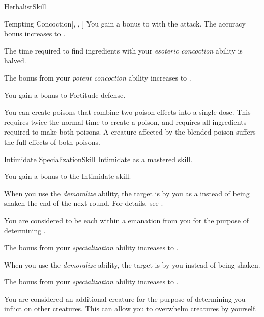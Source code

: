 \begin{feat}{Herbalist}{Skill}
\begin{attuneability}{Tempting Concoction}[, , ]
            \rankline
             You gain a  bonus to  with the attack.
             The accuracy bonus increases to .
        \end{attuneability}

         The time required to find ingredients with your \textit{esoteric concoction} ability is halved.

         The bonus from your \textit{potent concoction} ability increases to .

         You gain a  bonus to Fortitude defense.

         You can create poisons that combine two poison effects into a single dose.
        This requires twice the normal time to create a poison, and requires all ingredients required to make both poisons.
        A creature affected by the blended poison suffers the full effects of both poisons.
    \end{feat}

    \begin{feat}{Intimidate Specialization}{Skill}
        \featpre Intimidate as a mastered skill.

         You gain a  bonus to the Intimidate skill.

         When you use the \textit{demoralize} ability, the target is  by you as a  instead of being shaken the end of the next round.
        For details, see .

         You are considered to be  each  within a \arealarge emanation from you for the purpose of determining . 

         The bonus from your \textit{specialization} ability increases to .

         When you use the \textit{demoralize} ability, the target is \frightened by you instead of being shaken.

         The bonus from your \textit{specialization} ability increases to .

         You are considered an additional creature for the purpose of determining  you inflict on other creatures.
        This can allow you to overwhelm creatures by yourself.
    \end{feat}

